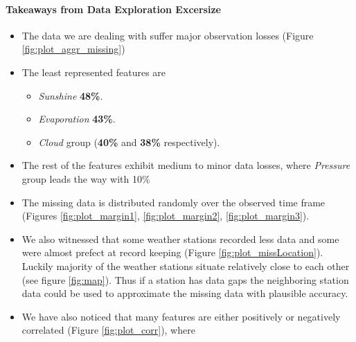\hypertarget{takeaways-from-data-exploration-excersize}{%
\paragraph{Takeaways from Data Exploration
Excersize}\label{takeaways-from-data-exploration-excersize}}

\begin{itemize}
\tightlist
\item
  The data we are dealing with suffer major observation losses (Figure
  \ref{fig:plot_aggr_missing})
\item
  The least represented features are

  \begin{itemize}
  \tightlist
  \item
    \emph{Sunshine} \textbf{48\%}.
  \item
    \emph{Evaporation} \textbf{43\%}.
  \item
    \emph{Cloud} group (\textbf{40\%} and \textbf{38\%} respectively).
  \end{itemize}
\item
  The rest of the features exhibit medium to minor data losses, where
  \emph{Pressure} group leads the way with 10\%
\item
  The missing data is distributed randomly over the observed time frame
  (Figures \ref{fig:plot_margin1}, \ref{fig:plot_margin2},
  \ref{fig:plot_margin3}).
\item
  We also witnessed that some weather stations recorded less data and
  some were almost prefect at record keeping (Figure
  \ref{fig:plot_missLocation}). Luckily majority of the weather stations
  situate relatively close to each other (see figure \ref{fig:map}).
  Thus if a station has data gaps the neighboring station data could be
  used to approximate the missing data with plausible accuracy.
\item
  We have also noticed that many features are either positively or
  negatively correlated (Figure \ref{fig:plot_corr}), where


\end{itemize}
